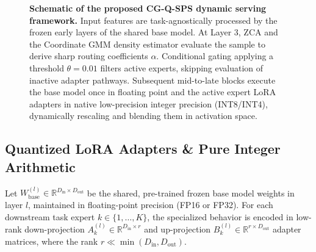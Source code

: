 \begin{figure}[t]
  \centering
  \caption{\textbf{Schematic of the proposed CG-Q-SPS dynamic serving framework.} Input features are task-agnostically processed by the frozen early layers of the shared base model. At Layer 3, ZCA and the Coordinate GMM density estimator evaluate the sample to derive sharp routing coefficients $\alpha$. Conditional gating applying a threshold $\theta=0.01$ filters active experts, skipping evaluation of inactive adapter pathways. Subsequent mid-to-late blocks execute the base model once in floating point and the active expert LoRA adapters in native low-precision integer precision (INT8/INT4), dynamically rescaling and blending them in activation space.}
  \label{fig:schematic}
\end{figure}

\subsection{Quantized LoRA Adapters \& Pure Integer Arithmetic}
Let $W_{\text{base}}^{(l)} \in \mathbb{R}^{D_{\text{in}} \times D_{\text{out}}}$ be the shared, pre-trained frozen base model weights in layer $l$, maintained in floating-point precision (FP16 or FP32). For each downstream task expert $k \in \{1, \dots, K\}$, the specialized behavior is encoded in low-rank down-projection $A_k^{(l)} \in \mathbb{R}^{D_{\text{in}} \times r}$ and up-projection $B_k^{(l)} \in \mathbb{R}^{r \times D_{\text{out}}}$ adapter matrices, where the rank $r \ll \min(D_{\text{in}}, D_{\text{out}})$.

